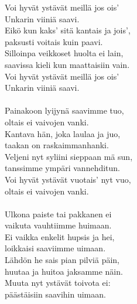 
Voi hyvät ystävät meillä jos ois' \\ Unkarin viiniä saavi. \\ Eikö kun kaks' sitä kantais ja jois', \\ paksusti voitais kuin paavi. \\ Silloinpa veikkoset huolta ei lain, \\ saavissa kieli kun maattaisiin vain. \\ Voi hyvät ystävät meillä jos ois' \\ Unkarin viiniä saavi. \\ \hspace{10mm} \\ Painakoon lyijynä saavimme tuo, \\ oltais ei vaivojen vanki. \\ Kantava hän, joka laulaa ja juo, \\ taakan on raskaimmanhanki. \\ Veljeni nyt syliini sieppaan mä sun, \\ tanssimme ympäri vannehditun. \\ Voi hyvät ystävät vuotais' nyt vuo, \\ oltais ei vaivojen vanki. \\ \hspace{10mm} \\ Ulkona paiste tai pakkanen ei \\ vaikuta vauhtiimme huimaan. \\ Ei vaikka enkelit hupsis ja hei, \\ loikkaisi saaviimme uimaan. \\ Lähdön he sais pian pilviä päin, \\ huutaa ja huitoa jaksamme näin. \\ Muuta nyt ystävät toivota ei: \\ päästäisiin saavihin uimaan.